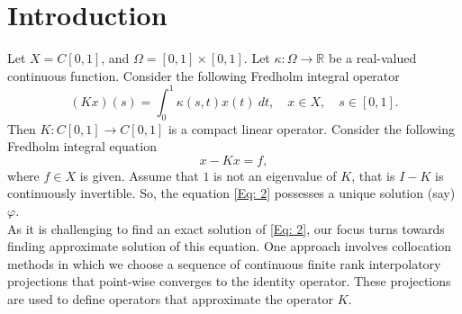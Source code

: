 \documentclass[sn-mathphys-num]{sn-jnl}%
\theoremstyle{thmstyleone}%
\theoremstyle{thmstyletwo}%
\theoremstyle{thmstylethree}%
\begin{document}
\section{Introduction}

Let $X = C[0, 1]$, and $\Omega = [0, 1] \times [0, 1]$. Let $\kappa : \Omega \rightarrow \mathbb{R}$ be a real-valued continuous function. Consider the following Fredholm integral operator
\begin{equation} \label {Eq: 1}
	(Kx)(s) = \int_{0}^{1} \kappa(s, t) x(t)~dt, \quad x \in X, \quad s \in [0, 1]. 
\end{equation}
Then $K : C[0, 1] \rightarrow C[0, 1]$ is a compact linear operator.
Consider the following Fredholm integral equation
\begin{equation} \label {Eq: 2}
	x - Kx = f, 
\end{equation}
where $f \in X$ is given. Assume that $1$ is not an eigenvalue of $K$, that is $I - K$ is continuously invertible. So, the equation \eqref{Eq: 2} possesses a unique solution (say) $\varphi$.\\
As it is challenging to find an exact solution of \eqref{Eq: 2}, our focus turns towards finding approximate solution of this equation. One approach involves collocation methods in which we choose a sequence of continuous finite rank interpolatory projections that point-wise converges to the identity operator. These projections are used to define operators that approximate the operator $K$.  
\end{document}
